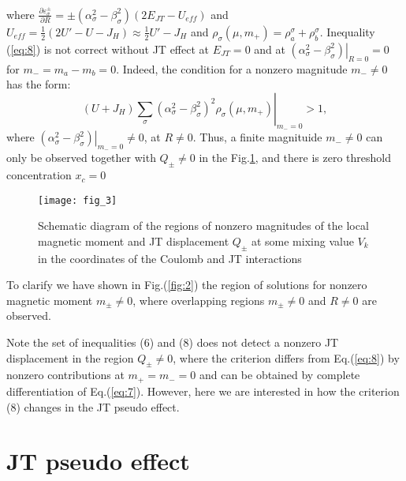 \documentclass[%
 reprint,
groupedaddress,
 amsmath,amssymb,
 aps,
prb,
]{revtex4-1}
\begin{document}
where $\frac{{\partial \varepsilon _\sigma ^ \pm  }}{{\partial R}} =  \pm \left( {\alpha _\sigma ^2  - \beta _\sigma ^2 } \right)\left( {2E_{JT}  - U_{eff} } \right)$ and $U_{eff}  = \frac{1}{2}\left( {2U' - U - J_H } \right) \approx \frac{1}{2}U' - J_H$ and $\rho _\sigma  \left( {\mu ,m_ +  } \right) = \rho _a^\sigma   + \rho _b^\sigma$. Inequality (\ref{eq:8}) is not correct without JT effect at $E_{JT}  = 0$ and at $\left. {\left( {\alpha _\sigma ^2  - \beta _\sigma ^2 } \right)} \right|_{R = 0}  = 0$ for $m_ -= m_a  - m_b  = 0$. Indeed, the condition for a nonzero magnitude $m_ -   \ne 0$   has the form:
\begin{equation} 
\left( {U + J_H } \right)\left. {\sum\limits_\sigma  {\left( {\alpha _\sigma ^2  - \beta _\sigma ^2 } \right)^2 \rho _\sigma ^{} \left( {\mu ,m_ +  } \right)} } \right|_{m_ -   = 0}  > 1,
\label{eq:9}
\end{equation}
 where $\left. {\left( {\alpha _\sigma ^2  - \beta _\sigma ^2 } \right)} \right|_{m_ -   = 0}  \ne 0$,  at $R \ne 0$. Thus, a finite magnituide  $m_ -   \ne 0$ can only be observed together with    $Q_ \pm   \ne 0$ in the Fig.\ref{fig:3}, and there is zero threshold concentration $x_c  = 0$
 
 \begin{figure}
\texttt{[image: fig\_3]}
\caption{Schematic diagram of the regions of  nonzero magnitudes of the local magnetic moment and JT displacement $Q_ \pm$ at some mixing value $V_k$  in the coordinates of the Coulomb and JT interactions}
\label{fig:3}
\end{figure}
 
 
 To clarify we have shown in Fig.(\ref{fig:2}) the region of solutions for nonzero magnetic moment $m_{\pm} \ne 0$, where overlapping regions $m_{\pm} \ne 0$ and $R \ne 0$  are observed. 


Note the set of inequalities (6) and (8)  does not detect  a nonzero   JT displacement in the region   $Q_ \pm   \ne 0$, where the criterion differs from Eq.(\ref{eq:8}) by nonzero contributions at $m_ +   = m_ -   = 0$ and can be obtained by complete differentiation of Eq.(\ref{eq:7}).  However, here we are interested in how the criterion (8) changes in the JT pseudo effect.

\section{\label{sec:III} JT pseudo effect \\}
\end{document}
